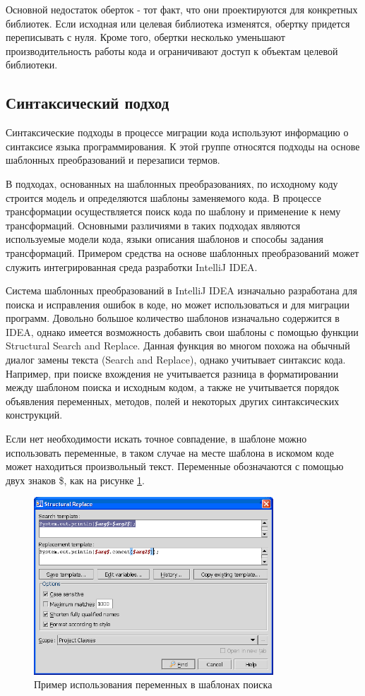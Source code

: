 Основной недостаток оберток - тот факт, что они проектируются для конкретных библиотек. Если исходная или целевая библиотека изменятся, обертку придется переписывать с нуля. Кроме того, обертки несколько уменьшают производительность работы кода и ограничивают доступ к объектам целевой библиотеки.

\subsection{Синтаксический подход}
Синтаксические подходы в процессе миграции кода используют информацию о синтаксисе языка программирования. К этой группе относятся подходы на основе шаблонных преобразований и перезаписи термов.

В подходах, основанных на шаблонных преобразованиях, по исходному коду строится модель и определяются шаблоны заменяемого кода. В процессе трансформации осуществляется поиск кода по шаблону и применение к нему трансформаций. Основными различиями в таких подходах являются используемые модели кода, языки описания шаблонов и способы задания трансформаций. Примером средства на основе шаблонных преобразований может служить интегрированная среда разработки IntelliJ IDEA.

Система шаблонных преобразований в IntelliJ IDEA изначально разработана для поиска и исправления ошибок в коде, но может использоваться и для миграции программ. Довольно большое количество шаблонов изначально содержится в IDEA, однако имеется возможность добавить свои шаблоны с помощью функции Structural Search and Replace\cite{ideaSSR}. Данная функция во многом похожа на обычный диалог замены текста (Search and Replace), однако учитывает синтаксис кода. Например, при поиске вхождения не учитывается разница в форматировании между шаблоном поиска и исходным кодом, а также не учитывается порядок объявления переменных, методов, полей и некоторых других синтаксических конструкций.

Если нет необходимости искать точное совпадение, в шаблоне можно использовать переменные, в таком случае на месте шаблона в искомом коде может находиться произвольный текст. Переменные обозначаются с помощью двух знаков \$, как на рисунке \ref{fig:ssr}.

\begin{figure}[H]
	\centering
	\includegraphics[width=0.8\textwidth]{ssr.png}
	\caption{Пример использования переменных в шаблонах поиска}%
	\label{fig:ssr}
\end{figure}

